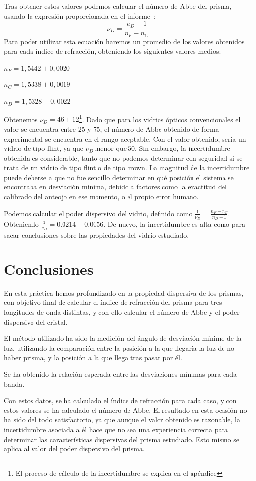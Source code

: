 \documentclass[10pt,onecolumn]{article}
\begin{document}
Tras obtener estos valores podemos calcular el número de Abbe del prisma, usando la expresión proporcionada en el informe~\cite{InfoOpticaPrisma}:
 \[
\nu_D = \frac{n_D - 1}{n_F - n_C}
\]
Para poder utilizar esta ecuación haremos un promedio de los valores obtenidos para cada 
índice de refracción, obteniendo los siguientes valores medios:

$n_F = 1,5442\pm 0,0020$	

$n_C = 1,5338\pm 0,0019$	

$n_D = 1,5328\pm 0,0022$

Obtenemos $\nu_D=46\pm12$\footnote{El proceso de cálculo de la incertidumbre se explica en el apéndice}. 
Dado que para los vidrios ópticos convencionales el valor se encuentra entre 25 y 75,
el número de Abbe obtenido de forma experimental 
se encuentra en el rango aceptable. Con el valor obtenido, sería un vidrio de tipo flint, ya que $\nu_D\ \text{menor que}\ 50$.
Sin embargo, la incertidumbre obtenida es considerable, tanto que no podemos determinar con seguridad si
se trata de un vidrio de tipo flint o de tipo crown.
La magnitud de la incertidumbre puede deberse a que no fue sencillo determinar en qué posición el sistema 
se encontraba en desviación mínima, debido a factores como la exactitud del calibrado del anteojo en ese 
momento, o el propio error humano.


Podemos calcular el poder dispersivo del vidrio, definido como $\frac{1}{\nu_D} = \frac{n_F - n_C}{n_D - 1}$. 
Obteniendo $\frac{1}{\nu_D}=0.0214\pm 0.0056$. De nuevo, la incertidumbre es alta como para 
sacar conclusiones sobre las propiedades del vidrio estudiado.

\section{Conclusiones}
En esta práctica hemos profundizado en la propiedad dispersiva de los prismas, con objetivo 
final de calcular el índice de refracción del prisma para tres longitudes de onda distintas, 
y con ello calcular el número de Abbe y el poder dispersivo del cristal.

El método utilizado ha sido la medición del ángulo de desviación mínimo de la luz, 
utilizando la comparación entre la posición a la que llegaría la luz de no haber prisma, 
y la posición a la que llega tras pasar por él.

Se ha obtenido la relación esperada entre las desviaciones mínimas para cada banda.

Con estos datos, se ha calculado el índice de refracción para cada caso, y con estos valores se ha calculado 
el número de Abbe. El resultado en esta ocasión no ha sido del todo satisfactorio, ya que aunque el 
valor obtenido es razonable, la incertidumbre asociada a él hace que no sea una experiencia correcta 
para determinar las características dispersivas del prisma estudiado. Esto mismo se aplica al valor del 
poder dispersivo del prisma.
\end{document}
